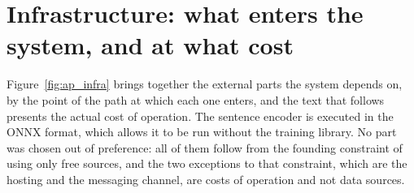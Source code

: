 \section{Infrastructure: what enters the system, and at what cost}
\label{sec:ap_infra}

Figure~\ref{fig:ap_infra} brings together the external parts the system depends on, by the point of
the path at which each one enters, and the text that follows presents the actual cost of operation.
The sentence encoder is executed in the \gls{ONNX} format, which allows it to be run without the
training library. No part was chosen out of preference: all of them follow from the founding
constraint of using only free sources, and the two exceptions to that constraint, which are the
hosting and the messaging channel, are costs of operation and not data sources.

